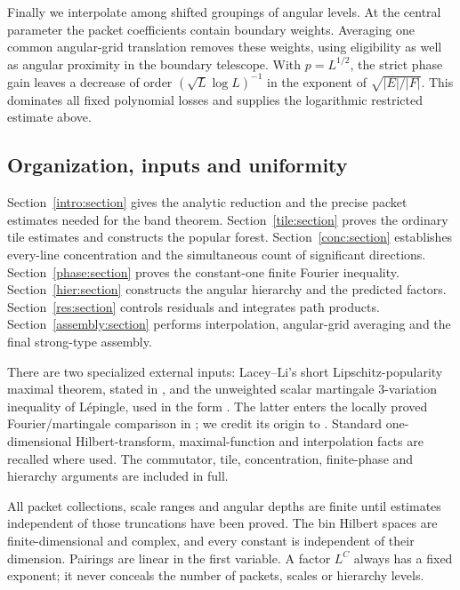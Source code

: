 Finally we interpolate among shifted groupings of angular levels.
At the central parameter the packet coefficients contain boundary
weights. Averaging one common angular-grid translation removes these
weights, using eligibility as well as angular proximity in the
boundary telescope. With \(p=L^{1/2}\), the strict phase gain leaves
a decrease of order \((\sqrt L\log L)^{-1}\) in the exponent of
\(\sqrt{|E|/|F|}\). This dominates all fixed polynomial losses and
supplies the logarithmic restricted estimate above.

\subsection{Organization, inputs and uniformity}

Section~\ref{intro:section} gives the analytic reduction and the
precise packet estimates needed for the band theorem.
Section~\ref{tile:section} proves the ordinary tile estimates and
constructs the popular forest.
Section~\ref{conc:section} establishes every-line concentration and
the simultaneous count of significant directions.
Section~\ref{phase:section} proves the constant-one finite Fourier
inequality.
Section~\ref{hier:section} constructs the angular hierarchy and the
predicted factors.
Section~\ref{res:section} controls residuals and integrates path
products.
Section~\ref{assembly:section} performs interpolation, angular-grid
averaging and the final strong-type assembly.

There are two specialized external inputs: Lacey--Li's short
Lipschitz-popularity maximal theorem, stated in
, and the unweighted scalar martingale
\(3\)-variation inequality of L\'epingle, used in the form
\cite[Theorem~1.1, \(p=2\), \(r=3\), weight one]{ZorinKranich2020}.
The latter enters the locally proved Fourier/martingale comparison
in ; we credit its origin to
\cite{Lepingle1976}. Standard one-dimensional Hilbert-transform,
maximal-function and interpolation facts are recalled where used.
The commutator, tile, concentration, finite-phase and hierarchy
arguments are included in full.

All packet collections, scale ranges and angular depths are finite
until estimates independent of those truncations have been proved.
The bin Hilbert spaces are finite-dimensional and complex, and every
constant is independent of their dimension. Pairings are linear in
the first variable. A factor \(L^C\) always has a fixed exponent;
it never conceals the number of packets, scales or hierarchy levels.
